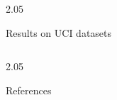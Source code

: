 \documentclass[final,12pt]{beamer}
\newlength{\colwidth}
\begin{document}
\begin{frame}[t]
\begin{columns}
\begin{column}{2.05\colwidth}
\begin{block}{Results on UCI datasets}
\end{block}
\end{column}
\end{columns}

\begin{columns}
\begin{column}{2.05\colwidth}
\vspace{-0.5cm}

  \nocite{*} %
  \begin{block}{References}
    \vspace*{-.25em}
    \footnotesize{}
  \end{block}

\end{column}
\end{columns}
\end{frame}
\end{document}
